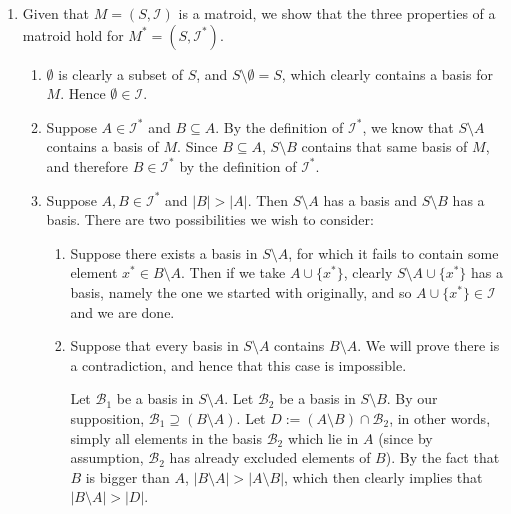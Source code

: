 \documentclass{article}
\begin{document}
\begin{enumerate}[label=(\alph*),topsep=0pt,itemsep=1ex,partopsep=1ex,parsep=1ex]

\item Given that $M = (S, \mathcal{I})$ is a matroid, we show that the three properties of a matroid hold for $M^* = (S, \mathcal{I}^*)$.

\begin{enumerate}[label=(\roman*),topsep=0pt,itemsep=1ex,partopsep=1ex,parsep=1ex]
    
    \item $\emptyset$ is clearly a subset of $S$, and $S \setminus \emptyset = S$, which clearly contains a basis for $M$. Hence $\emptyset \in \mathcal{I}$.
    
    \item Suppose $A \in \mathcal{I}^*$ and $B \subseteq A$. By the definition of $\mathcal{I}^*$, we know that $S \setminus A$ contains a basis of $M$. Since $B \subseteq A$, $S \setminus B$ contains that same basis of $M$, and therefore $B \in \mathcal{I}^*$ by the definition of $\mathcal{I}^*$.
    
    \item Suppose $A, B \in \mathcal{I}^*$ and $\left\vert{B}\right\vert > \left\vert{A}\right\vert$. Then $S \setminus A$ has a basis and $S \setminus B$ has a basis. There are two possibilities we wish to consider:
    
    \begin{enumerate}[label=(\arabic*),topsep=0pt,itemsep=1ex,partopsep=1ex,parsep=1ex]
    
        \item Suppose there exists a basis in $S \setminus A$, for which it fails to contain some element $x^* \in B \setminus A$. Then if we take $A \cup \{x^*\}$, clearly $S \setminus A \cup \{x^*\}$ has a basis, namely the one we started with originally, and so $A \cup \{x^*\} \in \mathcal{I}$ and we are done.
        
        \item Suppose that every basis in $S \setminus A$ contains $B \setminus A$. We will prove there is a contradiction, and hence that this case is impossible. 
        
        Let $\mathcal{B}_1$ be a basis in $S \setminus A$. Let $\mathcal{B}_2$ be a basis in $S \setminus B$. By our supposition, $\mathcal{B}_1 \supseteq (B \setminus A)$. Let $D := (A \setminus B) \cap \mathcal{B}_2$, in other words, simply all elements in the basis $\mathcal{B}_2$ which lie in $A$ (since by assumption, $\mathcal{B}_2$ has already excluded elements of $B$). By the fact that $B$ is bigger than $A$, $\left\vert{B \setminus A} \right\vert > \left\vert{A \setminus B}\right\vert$, which then clearly implies that $\left\vert{B \setminus A} \right\vert > \left\vert{D}\right\vert$. 
        

\end{enumerate}
\end{enumerate}
\end{enumerate}
\end{document}
